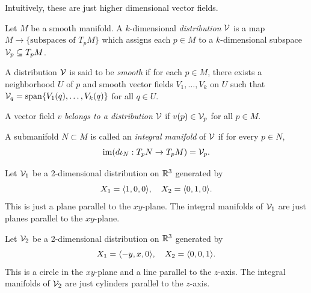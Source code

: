 Intuitively, these are just higher dimensional vector fields.

\begin{definition}
    Let \(M\) be a smooth manifold.
    A \(k\)-dimensional \emph{distribution} \(\cal{V}\) is a map \(M\to\{\text{subspaces of }T_p M\}\) which assigns each \(p\in M\) to a \(k\)-dimensional subspace \(\cal{V}_p\subseteq T_p M\).
\end{definition}

\begin{definition}
    A distribution \(\cal{V}\) is said to be \emph{smooth} if for each \(p\in M\), there exists a neighborhood \(U\) of \(p\) and smooth vector fields \(V_1,\dots,V_k\) on \(U\) such that \(\cal{V}_q = \spn\{V_1(q),\dots,V_k(q)\}\) for all \(q\in U\).
\end{definition}

\begin{definition}
    A vector field \(v\) \emph{belongs to a distribution} \(\cal{V}\) if \(v(p)\in\cal{V}_p\) for all \(p\in M\).
\end{definition}

\begin{definition}
    A submanifold \(N\subset M\) is called an \emph{integral manifold} of \(\cal{V}\) if for every \(p\in N\), \[
        \im(d\iota_N:T_p N\to T_p M) = \cal{V}_p.
    \]
\end{definition}

\begin{example}
    Let \(\cal{V}_1\) be a 2-dimensional distribution on \(\R^3\) generated by \[
      X_1 = \<1,0,0\>, \quad X_2 = \<0,1,0\>.
    \]
    \[
        
    \]
    This is just a plane parallel to the \(xy\)-plane. The integral manifolds of \(\cal{V}_1\) are just planes parallel to the \(xy\)-plane.
\end{example}

\begin{example}
    Let \(\cal{V}_2\) be a 2-dimensional distribution on \(\R^3\) generated by \[
      X_1 = \<-y,x,0\>, \quad X_2 = \<0,0,1\>.
    \]
    This is a circle in the \(xy\)-plane and a line parallel to the \(z\)-axis. The integral manifolds of \(\cal{V}_2\) are just cylinders parallel to the \(z\)-axis.
\end{example}


